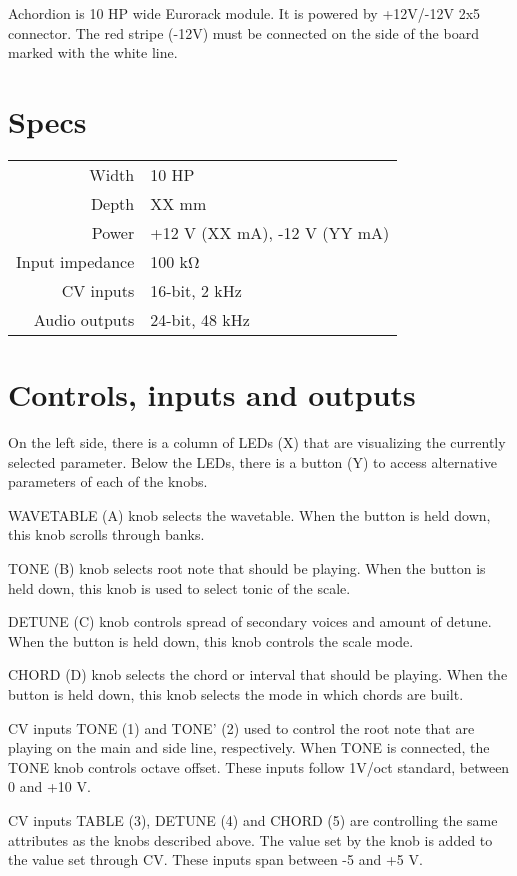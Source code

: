 \documentclass[10pt,nofoldmark,nocombine]{leaflet} %
\begin{document}
Achordion is 10 HP wide Eurorack module. It is powered by +12V/-12V 2x5 connector. The red stripe (-12V) must be connected on the side of the board marked with the white line.

\section{Specs}

\begin{tabular}{@{}rl@{}}
  Width & 10 HP \\
  Depth & XX mm \\
  Power & +12 V (XX mA), -12 V (YY mA) \\
  Input impedance & 100 kΩ \\
  CV inputs & 16-bit, 2 kHz \\
  Audio outputs & 24-bit, 48 kHz
\end{tabular}

\section{Controls, inputs and outputs}

On the left side, there is a column of LEDs (X) that are visualizing the currently selected parameter. Below the LEDs, there is a button (Y) to access alternative parameters of each of the knobs.

WAVETABLE (A) knob selects the wavetable. When the button is held down, this knob scrolls through banks.

TONE (B) knob selects root note that should be playing. When the button is held down, this knob is used to select tonic of the scale.

DETUNE (C) knob controls spread of secondary voices and amount of detune. When the button is held down, this knob controls the scale mode.

CHORD (D) knob selects the chord or interval that should be playing. When the button is held down, this knob selects the mode in which chords are built.

CV inputs TONE (1) and TONE' (2) used to control the root note that are playing on the main and side line, respectively. When TONE is connected, the TONE knob controls octave offset. These inputs follow 1V/oct standard, between 0 and +10 V.

CV inputs TABLE (3), DETUNE (4) and CHORD (5) are controlling the same attributes as the knobs described above. The value set by the knob is added to the value set through CV. These inputs span between -5 and +5 V.
\end{document}
